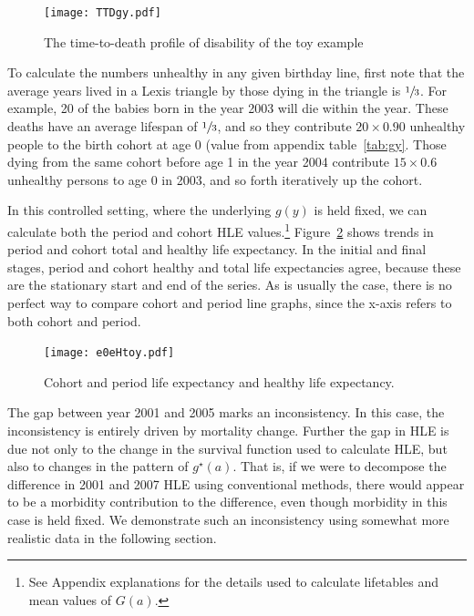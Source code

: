 \documentclass[11pt,oneside,a4paper]{article} %
\begin{document}
\begin{figure}
\begin{adjustwidth}{-1.5cm}{}
	\centering
	\texttt{[image: TTDgy.pdf]}
	\caption{The time-to-death profile of disability of the toy example}
	\label{fig:Fig_TTDgy}
\end{adjustwidth}
\end{figure}

To calculate the numbers unhealthy in any given birthday line, first note that
the average years lived in a Lexis triangle by those dying in the triangle is
$\sfrac{1}{3}$. For example, 20 of the
babies born in the year 2003 will die within the year. These deaths have an
average lifespan of $\sfrac{1}{3}$, and so they contribute $20\times0.90$ unhealthy
people to the birth cohort at age 0 (value from appendix table~\ref{tab:gy}.
Those dying from the same cohort before age 1 in the year 2004 contribute
$15\times0.6$ unhealthy persons to age 0 in 2003, and so forth iteratively up
the cohort.

In this controlled setting, where the underlying $g(y)$ is held fixed, we can
calculate both the period and cohort HLE values.\footnote{See Appendix
explanations for the details used to calculate lifetables and mean values of
$G(a)$. } Figure~\ref{fig:e0eHtoy} shows trends in period and cohort total and
healthy life expectancy. In the initial and final stages, period and cohort
healthy and total life expectancies agree, because these are the stationary
start and end of the series. As is usually the case, there is no perfect way to
compare cohort and period line graphs, since the x-axis refers to both cohort
and period. 

\begin{figure}
\begin{adjustwidth}{-1.5cm}{}
	\centering
	\texttt{[image: e0eHtoy.pdf]}
	\caption{Cohort and period life expectancy and healthy life expectancy.}
	\label{fig:e0eHtoy}
\end{adjustwidth}
\end{figure}

The gap between year 2001 and 2005 marks an inconsistency. In
this case, the inconsistency is entirely driven by mortality change. Further the
gap in HLE is due not only to the change in the survival function used to
calculate HLE, but also to changes in the pattern of $g^\star(a)$. That is,
if we were to decompose the difference in 2001 and 2007 HLE using conventional
methods, there would appear to be a morbidity contribution to the difference,
even though morbidity in this case is held fixed. We demonstrate such an
inconsistency using somewhat more realistic data in the following section.
 
\end{document}
